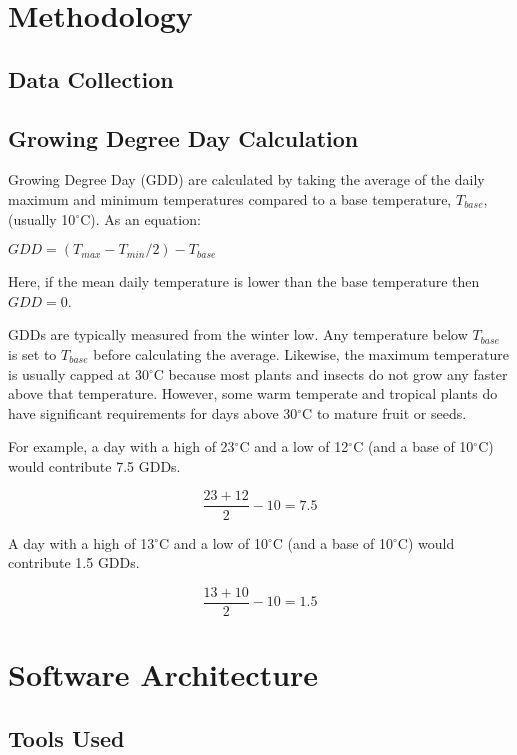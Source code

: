 \documentclass{article}
\begin{document}
\section{ \bf Methodology}
\subsection{Data Collection}
\subsection{Growing Degree Day Calculation}
Growing Degree Day (GDD) are calculated by taking the average of the daily maximum and minimum temperatures compared to a base temperature, $T_{base}$, (usually 10$^{\circ}$C). As an equation: \vspace{5mm}

{\centering
$ GDD = (T_{max} - T_{min} /2) - T_{base} $\\ [\baselineskip]
}

Here, if the mean daily temperature is lower than the base temperature then $GDD = 0$.\vspace{5mm}

GDDs are typically measured from the winter low. Any temperature below $T_{base}$ is set to $T_{base}$ before calculating the average. Likewise, the maximum temperature is usually capped at 30$^{\circ}$C because most plants and insects do not grow any faster above that temperature. However, some warm temperate and tropical plants do have significant requirements for days above 30$^{\circ}$C to mature fruit or seeds.\vspace{5mm}

For example, a day with a high of 23$^{\circ}$C and a low of 12$^{\circ}$C (and a base of 10$^{\circ}$C) would contribute 7.5 GDDs.\vspace{5mm}

\[ \frac {23+12}{2}-10=7.5 \] \par

A day with a high of 13$^{\circ}$C and a low of 10$^{\circ}$C (and a base of 10$^{\circ}$C) would contribute 1.5 GDDs.\vspace{5mm}

\[ \frac {13+10}{2}-10=1.5 \] \par

\noindent
\section{ \bf Software Architecture}
\subsection{Tools Used}
\end{document}
